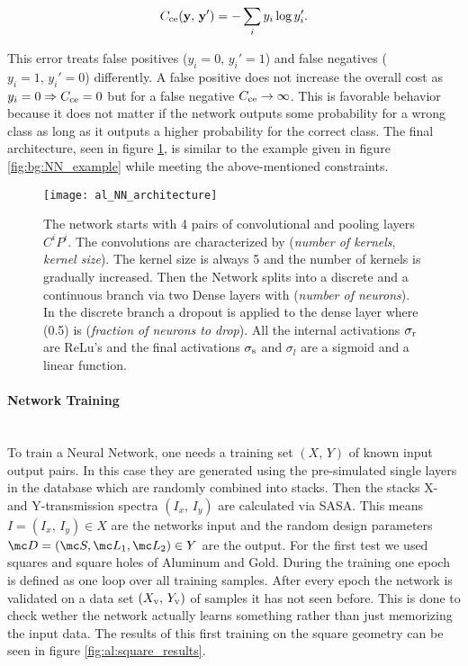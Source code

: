 \begin{equation}
    C_{\mathrm{ce}}(\vb y, \, \vb y') = - \sum_i y_i \log y'_i.
\end{equation}

\noindent
This error treats false positives ($y_i = 0, \, y_i' = 1$) and false negatives ($y_i = 1, \, y_i' = 0$) differently. A false positive does not increase the overall cost as $y_i = 0 \Rightarrow C_{\mathrm{ce}} = 0$ but for a false negative $C_{\mathrm{ce}} \rightarrow \infty$. This is favorable behavior because it does not matter if the network outputs some probability for a wrong class as long as it outputs a higher probability for the correct class. The final architecture, seen in figure \ref{fig:al:NN_architecture}, is similar to the example given in figure \ref{fig:bg:NN_example} while meeting the above-mentioned constraints.

\begin{figure}[H]
    \centering
    \texttt{[image: al\_NN\_architecture]}
    \caption{The network starts with 4 pairs of convolutional and pooling layers $C^i P^i   $. The convolutions are characterized by (\textit{number of kernels}, \textit{kernel size}). The kernel size is always 5 and the number of kernels is gradually increased. Then the Network splits into a discrete and a continuous branch via two Dense layers with (\textit{number of neurons}). In the discrete branch a dropout is applied to the dense layer where (0.5) is (\textit{fraction of neurons to drop}).
    All the internal activations $\sigma_{\mathrm{r}}$ are ReLu's and the final activations $\sigma_{\mathrm{s}}$ and $\sigma_{l}$ are a sigmoid and a linear function.}
    \label{fig:al:NN_architecture}
\end{figure}

\newpage
\paragraph{Network Training}~\\
To train a Neural Network, one needs a training set $(X, \, Y)$ of known input output pairs. In this case they are generated using the pre-simulated single layers in the database which are randomly combined into stacks. Then the stacks X- and Y-transmission spectra $(I_x, \, I_y)$ are calculated via SASA.
This means $I = (I_x, \, I_y) \in X$ are the networks input and the random design parameters ${\mc D = (\mc S, \mc L_1, \mc L_2) \in Y}$ are the output. For the first test we used squares and square holes of Aluminum and Gold. During the training one epoch is defined as one loop over all training samples. After every epoch the network is validated on a data set $(X_{\mathrm{v}}, \, Y_{\mathrm{v}})$ of samples it has not seen before. This is done to check wether the network actually learns something rather than just memorizing the input data.  The results of this first training on the square geometry can be seen in figure \ref{fig:al:square_results}.
\\

